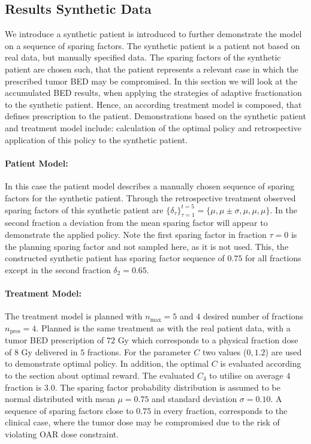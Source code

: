 \documentclass[\relativeRoot/ada.tex]{subfiles}
\begin{document}
\subsection{Results Synthetic Data}

We introduce a synthetic patient is introduced to further demonstrate the model on a sequence of sparing factors. The synthetic patient is a patient not based on real data, but manually specified data. The sparing factors of the synthetic patient are chosen such, that the patient represents a relevant case in which the prescribed tumor BED may be compromised. In this section we will look at the accumulated BED results, when applying the strategies of adaptive fractionation to the synthetic patient. Hence, an according treatment model is composed, that defines prescription to the patient. Demonstrations based on the synthetic patient and treatment model include: calculation of the optimal policy and retrospective application of this policy to the synthetic patient.

\paragraph{Patient Model:} In this case the patient model describes a manually chosen sequence of sparing factors for the synthetic patient. Through the retrospective treatment observed sparing factors of this synthetic patient are $\{\delta_\tau\}_{\tau=1}^{t=5} = \{\mu, \mu \pm \sigma, \mu,\mu, \mu \}$. In the second fraction a deviation from the mean sparing factor will appear to demonstrate the applied policy. Note the first sparing factor in fraction $\tau=0$ is the planning sparing factor and not sampled here, as it is not used. This, the constructed synthetic patient has sparing factor sequence of $0.75$ for all fractions except in the second fraction $\delta_2 = 0.65$. 

\paragraph{Treatment Model:} The treatment model is planned with $n_{\text{max}}=5$ and $4$ desired number of fractions $n_{\text{pres}}=4$. Planned is the same treatment as with the real patient data, with a tumor BED prescription of $72$ Gy which corresponds to a physical fraction dose of $8$ Gy delivered in $5$ fractions. For the parameter $C$ two values ($0, 1.2$) are used to demonstrate optimal policy. In addition, the optimal $C$ is evaluated according to the section about optimal reward. The evaluated $C_4$ to utilise on average $4$ fraction is $3.0$. The sparing factor probability distribution is assumed to be normal distributed with mean $\mu=0.75$ and standard deviation $\sigma = 0.10$. A sequence of sparing factors close to $0.75$ in every fraction, corresponds to the clinical case, where the tumor dose may be compromised due to the risk of violating OAR dose constraint.
\end{document}
